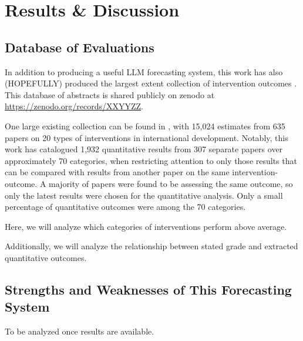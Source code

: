 \documentclass[12pt,a4paper]{article}
\begin{document}


\section{Results \& Discussion}
\subsection{Database of Evaluations}
\label{sub:database_of_evaluations}
In addition to producing a useful LLM forecasting system, this work has also (HOPEFULLY) %
produced the largest extent collection of intervention outcomes \ABSTRACT. This database of abstracts is shared publicly on zenodo at \url{https://zenodo.org/records/XXYYZZ}. %

One large existing collection can be found in , with 15,024 estimates from 635 papers on 20 types of interventions in international development. Notably, this work has catalogued 1,932 quantitative results from 307 separate papers over approximately 70 categories, when restricting attention to only those results that can be compared with results from another paper on the same intervention-outcome. A majority of papers were found to be assessing the same outcome, so only the latest results were chosen for the quantitative analysis. Only a small percentage of quantitative outcomes were among the 70 categories.

Here, we will analyze which categories of interventions perform above average.


Additionally, we will analyze the relationship between stated grade and extracted quantitative outcomes.

\subsection{Strengths and Weaknesses of This Forecasting System}
To be analyzed once results are available. %
\end{document}
